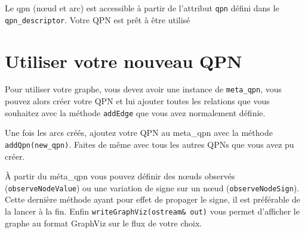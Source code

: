 \documentclass[11pt, a4paper]{article}
\begin{document}
Le qpn (nœud et arc) est accessible à partir de l'attribut \texttt{qpn} défini dans le \texttt{qpn\_descriptor}.
Votre QPN est prêt à être utilisé
 
\section{Utiliser votre nouveau QPN}
Pour utiliser votre graphe, vous devez avoir une instance de \texttt{meta\_qpn}, vous pouvez alors créer votre QPN et lui ajouter toutes les relations que vous souhaitez avec la méthode \texttt{addEdge} que vous avez normalement définie. 

Une fois les arcs créés, ajoutez votre QPN au meta\_qpn avec la méthode \texttt{addQpn(new\_qpn)}.
Faites de même avec tous les autres QPNs que vous avez pu créer. 

À partir du méta\_qpn vous pouvez définir des nœuds observés (\texttt{observeNodeValue}) ou une variation de signe sur un nœud (\texttt{observeNodeSign}). Cette dernière méthode ayant pour effet de propager le signe, il est préférable de la lancer à la fin. Enfin \texttt{writeGraphViz(ostream\& out)} vous permet d'afficher le graphe au format GraphViz sur le flux de votre choix.
\end{document}
